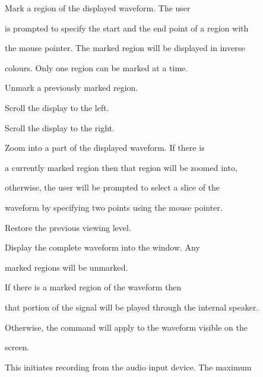 \begin{optlist}
   Mark a region of the displayed waveform. The user 


      is prompted to specify the start and the end point of a region with


      the mouse pointer. The marked region will be displayed in inverse 


      colours. Only one region can be marked at a time.





   Unmark a previously marked region.





  \ttitem{\hbbut{<--}} Scroll the display to the left.





  \ttitem{\hbbut{-->}} Scroll the display to the right.





   Zoom into a part of the displayed waveform. If there is 


      a currently marked region then that region will be zoomed into, 


      otherwise, the user will be prompted to select a slice of the 


      waveform by specifying two points using the mouse pointer.





   Restore the previous viewing level.  





   Display the complete waveform into the window. Any 


      marked regions will be unmarked.  





   If there is a marked region of the waveform then


      that portion of the signal will be played through the internal speaker.


      Otherwise, the command will apply to the waveform visible on the 


      screen.





   This initiates recording from the audio input device. The maximum



\end{optlist}
